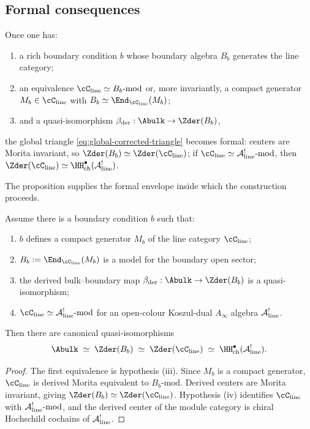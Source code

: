 \subsection{Formal consequences}

Once one has:
\begin{enumerate}[label=(\roman*),leftmargin=1.8em]
\item a rich boundary condition $b$ whose boundary algebra $B_b$ generates the line category;
\item an equivalence $\cC_{\mathrm{line}}\simeq B_b\text{-mod}$ or, more invariantly, a compact generator $M_b\in \cC_{\mathrm{line}}$ with $B_b\simeq \End_{\cC_{\mathrm{line}}}(M_b)$;
\item and a quasi-isomorphism $\beta_{\der}:\Abulk\to \Zder(B_b)$,
\end{enumerate}
the global triangle \eqref{eq:global-corrected-triangle} becomes formal: centers are Morita invariant, so $\Zder(B_b)\simeq \Zder(\cC_{\mathrm{line}})$; if $\cC_{\mathrm{line}}\simeq \cA^!_{\mathrm{line}}\text{-mod}$, then $\Zder(\cC_{\mathrm{line}})\simeq \HH^\bullet_{\mathrm{ch}}(\cA^!_{\mathrm{line}})$.

The proposition supplies the formal envelope inside which the construction proceeds.

\begin{proposition}\label{prop:formal-global-triangle}
Assume there is a boundary condition $b$ such that:
\begin{enumerate}[label=(\roman*),leftmargin=1.8em]
\item $b$ defines a compact generator $M_b$ of the line category $\cC_{\mathrm{line}}$;
\item $B_b:=\End_{\cC_{\mathrm{line}}}(M_b)$ is a model for the boundary open sector;
\item the derived bulk--boundary map $\beta_{\der}:\Abulk\to \Zder(B_b)$ is a quasi-isomorphism;
\item $\cC_{\mathrm{line}}\simeq \cA^!_{\mathrm{line}}\text{-mod}$ for an open-colour Koszul-dual $A_\infty$ algebra $\mathcal{A}^!_{\mathrm{line}}$.
\end{enumerate}
Then there are canonical quasi-isomorphisms
\[
\Abulk
\;\simeq\;
\Zder(B_b)
\;\simeq\;
\Zder(\cC_{\mathrm{line}})
\;\simeq\;
\HH^\bullet_{\mathrm{ch}}(\cA^!_{\mathrm{line}}).
\]
\end{proposition}

\begin{proof}
The first equivalence is hypothesis (iii). Since $M_b$ is a compact generator, $\cC_{\mathrm{line}}$ is derived Morita equivalent to $B_b\text{-mod}$. Derived centers are Morita invariant, giving $\Zder(B_b)\simeq \Zder(\cC_{\mathrm{line}})$. Hypothesis (iv) identifies $\cC_{\mathrm{line}}$ with $\mathcal{A}^!_{\mathrm{line}}\text{-mod}$, and the derived center of the module category is chiral Hochschild cochains of $\mathcal{A}^!_{\mathrm{line}}$.
\end{proof}

